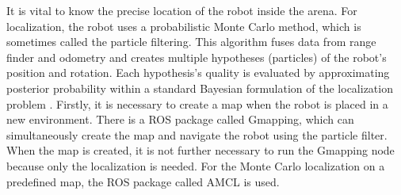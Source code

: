 It is vital to know the precise location of the robot inside the arena. For localization, the robot uses a probabilistic Monte Carlo method, which is sometimes called the particle filtering. This algorithm fuses data from range finder and odometry and creates multiple hypotheses (particles) of the robot's position and rotation. Each hypothesis’s quality is evaluated by approximating posterior probability within a standard Bayesian formulation of the localization problem \cite{dellaert1999} \cite{thrun2000}. Firstly, it is necessary to create a map when the robot is placed in a new environment. There is a ROS package called Gmapping, which can simultaneously create the map and navigate the robot using the particle filter. When the map is created, it is not further necessary to run the Gmapping node because only the localization is needed. For the Monte Carlo localization on a predefined map, the ROS package called AMCL is used.
